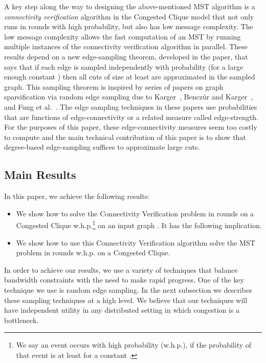 \documentclass[11pt]{article}
\begin{document}
A key step along the way to designing the above-mentioned MST algorithm is a 
\textit{connectivity verification} algorithm in the Congested Clique model that not only 
runs in  rounds with high probability, but also has low message complexity. 
The low message complexity allows the fast computation of an MST by running multiple instances 
of the connectivity verification algorithm in parallel.
These results depend on a new edge-sampling theorem, developed in the paper, 
that says that if each edge  is sampled independently with probability  (for a large enough constant ) then
all cuts of size at least  are approximated in the sampled graph.
This sampling theorem is inspired by series of papers on graph sparsification via random edge 
sampling due to Karger~\cite{karger1994stoc}, Bencz\'{u}r and Karger~\cite{benczurKarger2002arxiv, benczurKarger1996stoc}, and Fung et al.~\cite{fung2011stoc}.
The edge sampling techniques in these papers use probabilities that are functions of 
edge-connectivity or a related measure called edge-strength.
For the purposes of this paper, these edge-connectivity measures seem too costly to compute 
and the main technical contribution of this paper is to
show that degree-based edge-sampling suffices to approximate large cuts.

\subsection{Main Results}
\label{section:mainResults}
In this paper, we achieve the following results:
\begin{itemize}
  \item We show how to solve the Connectivity Verification problem in  rounds  on a Congested Clique w.h.p.\footnote{We say an event occurs with high probability (w.h.p.), if the probability of that event is at least  for a constant .} on an input graph .
It has the following implication.

\item We show how to use this Connectivity Verification algorithm solve the MST problem in  rounds w.h.p. on a Congested Clique. 
\end{itemize}
In order to achieve our results, we use a variety of techniques that balance bandwidth constraints with the need to make rapid progress. 
One of the key technique we use is random edge sampling. 
In the next subsection we describes these sampling techniques at a high level. 
We believe that our techniques will have independent utility in any distributed setting in which congestion is a bottleneck. 
\end{document}
